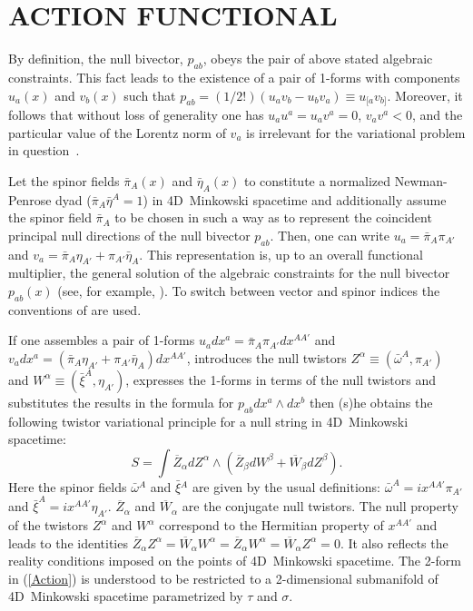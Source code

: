 \documentclass[a4paper,twocolumn,showkeys,showpacs,aps]{revtex4}
\begin{document}
\section{ACTION FUNCTIONAL}

By definition, the null bivector, $p_{ab}$, obeys the pair of
above stated algebraic constraints. This fact leads to the
existence of a pair of 1-forms with components $u_a(x)$ and
$v_b(x)$ such that $p_{ab} = (1/2!)(u_a v_b - u_b v_a)\equiv
u_{[a}v_{b]}$. Moreover, it follows that without loss of
generality one has $u_a u^a = u_a v^a = 0$, $v_a v^a < 0$, and the
particular value of the Lorentz norm of $v_a$ is irrelevant for
the variational problem in question~\cite{Schouten}.

Let the spinor fields $\bar{\pi}_A(x)$\hspace{1ex} and
$\bar{\eta}_A(x)$\hspace{1ex} to con\-s\-ti\-tu\-te a normalized
Newman-Penrose dyad ($\bar{\pi}_A \bar{\eta}^A = 1$) in
4D~Minkowski spacetime and additionally assume the spinor field
$\bar{\pi}_A$ to be chosen in such a way as to represent the
coincident principal null directions of the null bivector
$p_{ab}$. Then, one can write $u_a = \bar{\pi}_A\pi_{A'}$ and $v_a
= \bar{\pi}_A\eta_{A'} + \pi_{A'}\bar{\eta}_A$. This
representation is, up to an overall functional multiplier, the
general solution of the algebraic constraints for the null
bivector $p_{ab}(x)$ (see, for example, \cite{SST}). To switch
between vector and spinor indices the conventions of \cite{SST}
are used.

If one assembles a pair of 1-forms $u_a dx^a = \bar{\pi}_A
\pi_{A'} dx^{AA'}$ and $v_a dx^a = (\bar{\pi}_A \eta_{A'} +
\pi_{A'}\bar{\eta}_A)dx^{AA'}$, introduces the null twistors
$Z^\alpha \equiv (\bar{\omega}^A , \pi_{A'})$ and $W^\alpha \equiv
(\bar{\xi}^A , \eta_{A'})$, expresses the 1-forms in terms of the
null twistors and substitutes the results in the formula for
$p_{ab}dx^{a}\wedge dx^{b}$ then (s)he obtains the following
twistor variational principle for a null string in 4D~Minkowski
spacetime:
\begin{equation}
S = \int \overline{Z}_\alpha dZ^\alpha \wedge \left(
\overline{Z}_\beta dW^\beta + \overline{W}_\beta dZ^\beta
\right).%
\label{Action}
\end{equation}
Here the spinor fields $\bar{\omega}{}^A$ and $\bar{\xi}{}^A$ are
given by the usual definitions: $\bar{\omega}^A =
ix^{AA'}\pi_{A'}$ and $\bar{\xi}^A = ix^{AA'}\eta_{A'}$.
$\overline{Z}_\alpha$ and $\overline{W}_\alpha$ are the conjugate
null twistors. The null property of the twistors $Z^\alpha$ and
$W^\alpha$ correspond to the Hermitian property of $x^{AA'}$ and
leads to the identities $\overline{Z}_\alpha Z^\alpha =
\overline{W}_\alpha W^\alpha = \overline{Z}_\alpha W^\alpha =
\overline{W}_\alpha Z^\alpha = 0$. It also reflects the reality
conditions imposed on the points of 4D~Minkowski spacetime. The
2-form in (\ref{Action}) is understood to be restricted to a
2-dimensional submanifold of 4D~Minkowski spacetime parametrized
by $\tau$ and $\sigma$.
\end{document}
